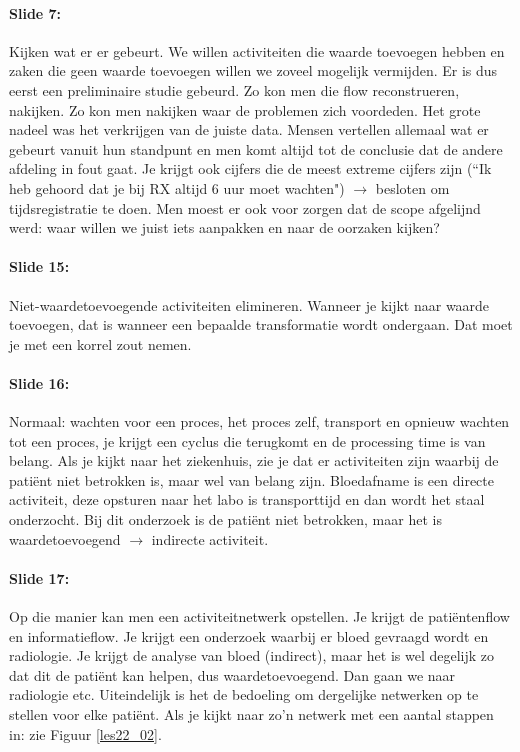 \documentclass[10pt,a4paper]{report}
\begin{document}
\paragraph{Slide 7:} Kijken wat er er gebeurt. We willen activiteiten die waarde toevoegen hebben en zaken die geen waarde toevoegen willen we zoveel mogelijk vermijden. Er is dus eerst een preliminaire studie gebeurd. Zo kon men die flow reconstrueren, nakijken. Zo kon men nakijken waar de problemen zich voordeden. Het grote nadeel was het verkrijgen van de juiste data. Mensen vertellen allemaal wat er gebeurt vanuit hun standpunt en men komt altijd tot de conclusie dat de andere afdeling in fout gaat. Je krijgt ook cijfers die de meest extreme cijfers zijn (``Ik heb gehoord dat je bij RX altijd 6 uur moet wachten") $\rightarrow$ besloten om tijdsregistratie te doen. Men moest er ook voor zorgen dat de scope afgelijnd werd: waar willen we juist iets aanpakken en naar de oorzaken kijken?

\paragraph{Slide 15:} Niet-waardetoevoegende activiteiten elimineren. Wanneer je kijkt naar waarde toevoegen, dat is wanneer een bepaalde transformatie wordt ondergaan. Dat moet je met een korrel zout nemen. 

\paragraph{Slide 16:} Normaal: wachten voor een proces, het proces zelf, transport en opnieuw wachten tot een proces, je krijgt een cyclus die terugkomt en de processing time is van belang. Als je kijkt naar het ziekenhuis, zie je dat er activiteiten zijn waarbij de pati\"ent niet betrokken is, maar wel van belang zijn. Bloedafname is een directe activiteit, deze opsturen naar het labo is transporttijd en dan wordt het staal onderzocht. Bij dit onderzoek is de pati\"ent niet betrokken, maar het is waardetoevoegend $\rightarrow$ indirecte activiteit.

\paragraph{Slide 17:} Op die manier kan men een activiteitnetwerk opstellen. Je krijgt de pati\"entenflow en informatieflow. Je krijgt een onderzoek waarbij er bloed gevraagd wordt en radiologie. Je krijgt de analyse van bloed (indirect), maar het is wel degelijk zo dat dit de pati\"ent kan helpen, dus waardetoevoegend. Dan gaan we naar radiologie etc.
Uiteindelijk is het de bedoeling om dergelijke netwerken op te stellen voor elke pati\"ent. Als je kijkt naar zo'n netwerk met een aantal stappen in: zie Figuur \ref{les22_02}.
\end{document}
